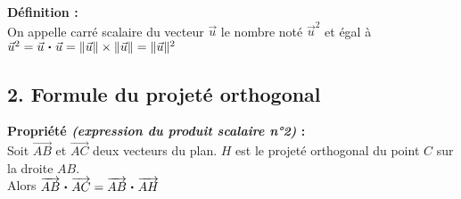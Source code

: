 \documentclass[11pt,a4paper]{article}
\newcommand{\pdt}{\mathbin{\vcenter{\hbox{\scalebox{0.6}{\textbullet}}}}}
\begin{document}
\begin{mdframed}[style=definitionStyle]
    \textbf{Définition :} ~\\
    On appelle carré scalaire du vecteur $\vec{u}$ le nombre noté $\vec{u}^2$ et égal à $\vec{u}^2=\vec{u}\pdt\vec{u}= \| \vec{u} \| \times \| \vec{u}\| = \| \vec{u}\|^2$
\end{mdframed}

\subsection*{2. Formule du projeté orthogonal}

\begin{mdframed}[style=proprieteStyle]
    \textbf{Propriété \emph{(expression du produit scalaire n°2)} :} ~\\
    Soit $\overrightarrow{AB}$ et $\overrightarrow{AC}$ deux vecteurs du plan. $H$ est le projeté orthogonal du point
    $C$ sur la droite $AB$. \\
    Alors $\overrightarrow{AB}\pdt\overrightarrow{AC}=\overrightarrow{AB}\pdt\overrightarrow{AH}$
\end{mdframed}
\end{document}
